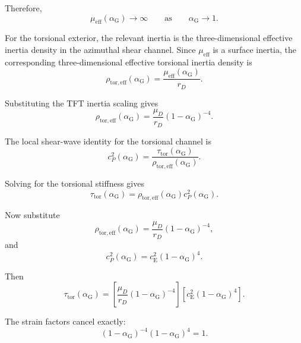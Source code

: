 Therefore,
\begin{equation}
    \mu_{\mathrm{eff}}(\alpha_{\mathrm{G}}) \rightarrow \infty \qquad \text{as} \qquad \alpha_{\mathrm{G}} \rightarrow 1.
\end{equation}

For the torsional exterior, the relevant inertia is the three-dimensional effective inertia density in the azimuthal shear channel. Since $\mu_{\mathrm{eff}}$ is a surface inertia, the corresponding three-dimensional effective torsional inertia density is
\begin{equation}
    \rho_{\mathrm{tor,eff}}(\alpha_{\mathrm{G}}) = \frac{\mu_{\mathrm{eff}}(\alpha_{\mathrm{G}})}{r_D}.
\end{equation}

Substituting the TFT inertia scaling gives
\begin{equation}
    \rho_{\mathrm{tor,eff}}(\alpha_{\mathrm{G}}) = \frac{\mu_D}{r_D}(1-\alpha_{\mathrm{G}})^{-4}.
\end{equation}

The local shear-wave identity for the torsional channel is
\begin{equation}
    c_P^2(\alpha_{\mathrm{G}}) = \frac{\tau_{\mathrm{tor}}(\alpha_{\mathrm{G}})}{\rho_{\mathrm{tor,eff}}(\alpha_{\mathrm{G}})}.
\end{equation}

Solving for the torsional stiffness gives
\begin{equation}
    \tau_{\mathrm{tor}}(\alpha_{\mathrm{G}}) = \rho_{\mathrm{tor,eff}}(\alpha_{\mathrm{G}})c_P^2(\alpha_{\mathrm{G}}).
\end{equation}

Now substitute
\begin{equation}
    \rho_{\mathrm{tor,eff}}(\alpha_{\mathrm{G}}) = \frac{\mu_D}{r_D}(1-\alpha_{\mathrm{G}})^{-4},
\end{equation}
and
\begin{equation}
    c_P^2(\alpha_{\mathrm{G}}) = c_{\mathrm{E}}^2(1-\alpha_{\mathrm{G}})^4.
\end{equation}

Then
\begin{equation}
    \tau_{\mathrm{tor}}(\alpha_{\mathrm{G}}) = \left[ \frac{\mu_D}{r_D}(1-\alpha_{\mathrm{G}})^{-4} \right] \left[ c_{\mathrm{E}}^2(1-\alpha_{\mathrm{G}})^4 \right].
\end{equation}

The strain factors cancel exactly:
\begin{equation}
    (1-\alpha_{\mathrm{G}})^{-4}(1-\alpha_{\mathrm{G}})^4 = 1.
\end{equation}

